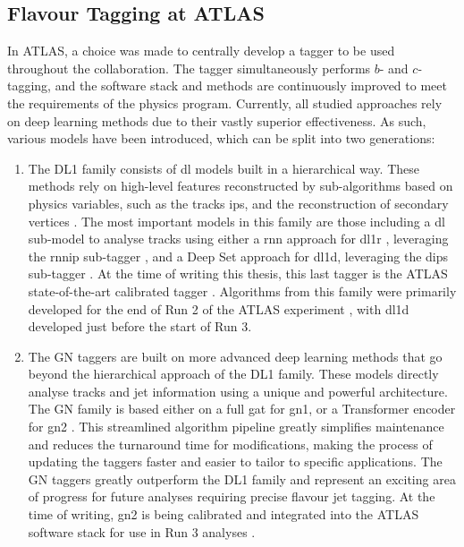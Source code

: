 \subsection{Flavour Tagging at ATLAS}
In ATLAS, a choice was made to centrally develop a tagger to be used throughout the collaboration. The tagger simultaneously performs $b$- and $c$-tagging, and the software stack and methods are continuously improved to meet the requirements of the physics program. Currently, all studied approaches rely on deep learning methods due to their vastly superior effectiveness. As such, various models have been introduced, which can be split into two generations: 
\begin{enumerate}
  \item The DL1 family consists of \gls{dl} models built in a hierarchical way. These methods rely on high-level features reconstructed by sub-algorithms based on physics variables, such as the tracks \glspl{ip}, and the reconstruction of secondary vertices \cite{ATL-PHYS-PUB-2015-022}. The most important models in this family are those including a \gls{dl} sub-model to analyse tracks using either a \gls{rnn} approach for \gls{dl1r} \cite{ATLAS:2017bcq}, leveraging the \gls{rnnip} sub-tagger \cite{ATL-PHYS-PUB-2017-003}, and a Deep Set approach for \gls{dl1d}, leveraging the \gls{dips} sub-tagger \cite{ATL-PHYS-PUB-2020-014}. At the time of writing this thesis, this last tagger is the ATLAS state-of-the-art calibrated tagger \cite{ATL-SOFT-PUB-2021-001}. Algorithms from this family were primarily developed for the end of Run 2 of the ATLAS experiment \cite{atlas:FTAGRUN2}, with \gls{dl1d} developed just before the start of Run 3.
  \item The GN taggers are built on more advanced deep learning methods that go beyond the hierarchical approach of the DL1 family. These models directly analyse tracks and jet information using a unique and powerful architecture. The GN family is based either on a full \gls{gat} for \gls{gn1}, or a Transformer encoder for \gls{gn2} \cite{ATL-PHYS-PUB-2022-027, ATL-PLOT-FTAG-2023-01, duperrin2023flavour}. This streamlined algorithm pipeline greatly simplifies maintenance and reduces the turnaround time for modifications, making the process of updating the taggers faster and easier to tailor to specific applications. The GN taggers greatly outperform the DL1 family and represent an exciting area of progress for future analyses requiring precise flavour jet tagging. At the time of writing, \gls{gn2} is being calibrated and integrated into the ATLAS software stack for use in Run 3 analyses \cite{ATL-SOFT-PUB-2021-001}.  
\end{enumerate}

